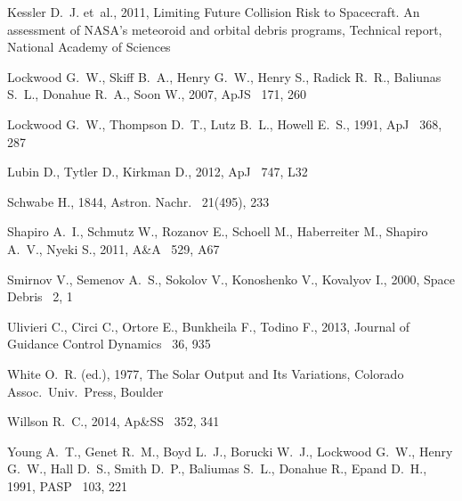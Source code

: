 \documentclass[useAMS,usenatbib]{mn2e}
\begin{document}
\begin{thebibliography}{}
Kessler D.~J. et~al., 2011,
\newblock Limiting Future Collision Risk to Spacecraft. An assessment of NASA's
  meteoroid and orbital debris programs,
\newblock Technical report, National Academy of Sciences

{Lockwood} G.~W., {Skiff} B.~A., {Henry} G.~W., {Henry} S., {Radick} R.~R.,
  {Baliunas} S.~L., {Donahue} R.~A., {Soon} W., 2007, ApJS~  171, 260

{Lockwood} G.~W., {Thompson} D.~T., {Lutz} B.~L., {Howell} E.~S., 1991, ApJ~
  368, 287

{Lubin} D., {Tytler} D., {Kirkman} D., 2012, ApJ~  747, L32

Schwabe H., 1844, Astron. Nachr.~  21(495), 233

{Shapiro} A.~I., {Schmutz} W., {Rozanov} E., {Schoell} M., {Haberreiter} M.,
  {Shapiro} A.~V., {Nyeki} S., 2011, A\&A~  529, A67

Smirnov V., Semenov A.~S., Sokolov V., Konoshenko V., Kovalyov I., 2000, Space
  Debris~  2, 1

{Ulivieri} C., {Circi} C., {Ortore} E., {Bunkheila} F., {Todino} F., 2013,
  Journal of Guidance Control Dynamics~  36, 935

White O.~R. (ed.), 1977,
\newblock The Solar Output and Its Variations, Colorado Assoc.\ Univ.\ Press,
  Boulder

{Willson} R.~C., 2014, Ap\&SS~  352, 341

{Young} A.~T., {Genet} R.~M., {Boyd} L.~J., {Borucki} W.~J., {Lockwood} G.~W.,
  {Henry} G.~W., {Hall} D.~S., {Smith} D.~P., {Baliumas} S.~L., {Donahue} R.,
  {Epand} D.~H., 1991, PASP~  103, 221

\end{thebibliography}




\label{lastpage}
\end{document}
